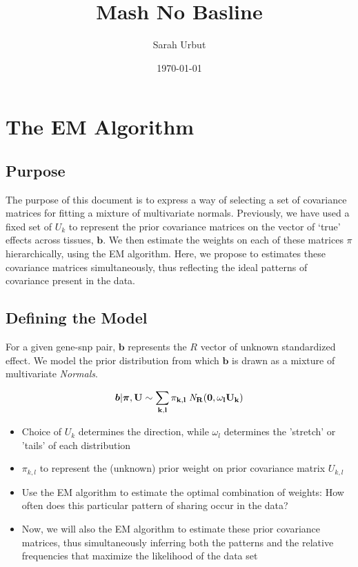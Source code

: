 \documentclass[11pt, oneside]{article}   	%
\title{Mash No Basline}
\author{Sarah Urbut}
\date{\today}
\begin{document}
\maketitle
\section{The EM Algorithm}
\subsection{Purpose}

The purpose of this document is to express a way of selecting a set of covariance matrices for fitting a mixture of multivariate normals. Previously, we have used a fixed set of $U_k$ to represent the prior covariance matrices on the vector of `true' effects across tissues, $\bm{b}$. We then estimate the weights on each of these matrices $\pi$ hierarchically, using the EM algorithm. Here, we propose to estimates these covariance matrices simultaneously, thus reflecting the ideal patterns of covariance present in the data.


\subsection{Defining the Model}

For a given gene-snp pair, $\bm{b}$ represents the $R$ vector of unknown standardized effect. We model the prior distribution from which $\bm{b}$ is drawn as a mixture of multivariate {\it Normals}.
 
 \begin{equation}
  \label{prior_b_mixt_grid}
  \bm{b} | \bm{\pi},\bf{U} \sim \sum_{k,l} \pi_{k,l} \;{\it N}_R(\bm{0}, \omega_l U_{k})
\end{equation}

\begin{itemize}  
\item Choice of $U_k$ determines the direction, while $\omega_l$ determines the 'stretch' or 'tails' of each distribution
\item $\pi_{k,l}$ to represent the (unknown) prior weight on prior covariance matrix $U_{k,l}$ 
\item  Use the EM algorithm to estimate the optimal combination of weights: How often does this particular pattern of sharing  occur in the data?
\item Now, we will also the EM algorithm to estimate these prior covariance matrices, thus simultaneously inferring both the patterns and the relative frequencies that maximize the likelihood of the data set
\end{itemize} 
\end{document}
